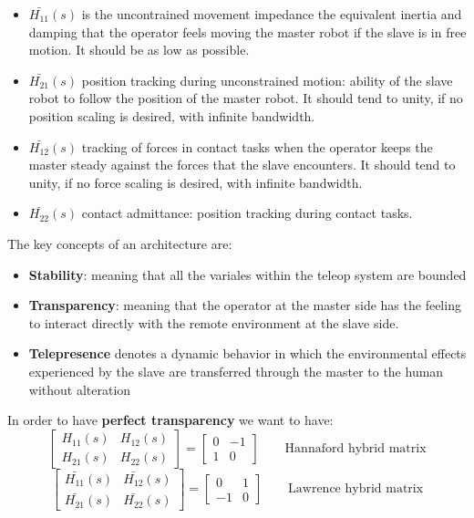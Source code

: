 \documentclass[a4paper,12pt]{article}
\begin{document}
\begin{itemize}
    \item $\bar{H_{11}}(s)$ is the uncontrained movement impedance the equivalent inertia and damping that the operator feels moving the master robot if the slave is in free motion. It should be as low as possible. 
    \item $\bar{H_{21}}(s)$ position tracking during unconstrained motion: ability of the slave robot to follow the position of the master robot. It should tend to unity, if no position scaling is desired, with infinite bandwidth. 
    \item $\bar{H_{12}}(s)$ tracking of forces in contact tasks when the operator keeps the master steady against the forces that the slave encounters. It should tend to unity, if no force scaling is desired, with infinite bandwidth.
    \item $\bar{H_{22}}(s)$ contact admittance: position tracking during contact tasks.
\end{itemize}

\bigskip
The key concepts of an architecture are:
\bigskip
\begin{itemize}
    \item \textbf{Stability}: meaning that all the variales within the teleop system are bounded
    \item \textbf{Transparency}: meaning that the operator at the master side has the feeling to interact directly with the remote environment at the slave side.
    \item \textbf{Telepresence} denotes a dynamic behavior in which the environmental effects experienced by the slave are transferred through the master to the human without alteration
\end{itemize}

\bigskip 
\noindent In order to have \textbf{perfect transparency} we want to have:
\[
    \begin{bmatrix}
        H_{11}(s) & H_{12}(s) \\ H_{21}(s) & H_{22}(s)
    \end{bmatrix} = \begin{bmatrix}
        0 & -1 \\ 1 & 0
    \end{bmatrix} \qquad \text{Hannaford hybrid matrix}
\]
\[
    \begin{bmatrix}
        \bar{H_{11}}(s) & \bar{H_{12}}(s) \\ \bar{H_{21}}(s) &\bar{ H_{22}}(s)
    \end{bmatrix} = \begin{bmatrix}
        0 & 1 \\ -1 & 0
    \end{bmatrix} \qquad \text{Lawrence hybrid matrix}
\]
\end{document}

